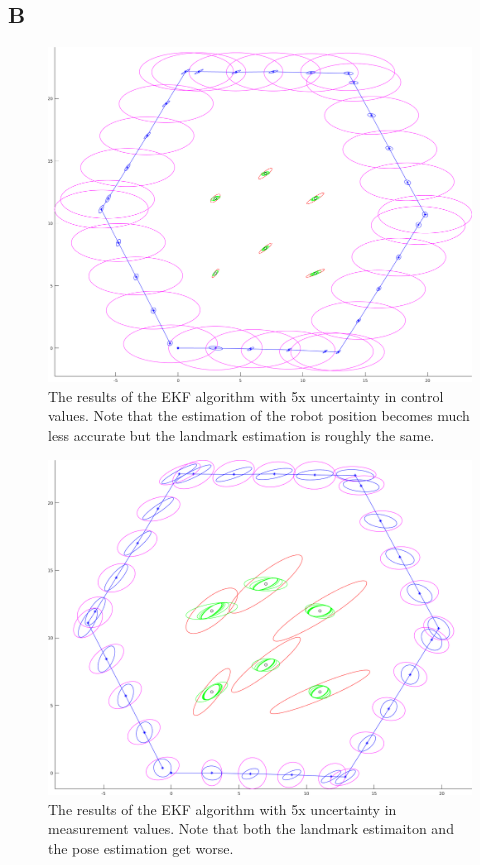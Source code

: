 \documentclass[letterpaper]{article}
\begin{document}
\subsection*{B}
\begin{figure}[H]
    \includegraphics[width=\textwidth]{EKF_slam/5xworsecontrol.png}
    \caption{The results of the EKF algorithm with 5x uncertainty in control values. Note that the estimation of the robot position becomes much less accurate but the landmark estimation is roughly the same.}

\end{figure}
\begin{figure}[H]
    \includegraphics[width=\textwidth]{EKF_slam/5xworsemeasurement.png}
    \caption{The results of the EKF algorithm with 5x uncertainty in measurement values. Note that both the landmark estimaiton and the pose estimation get worse.}

\end{figure}
\end{document}
